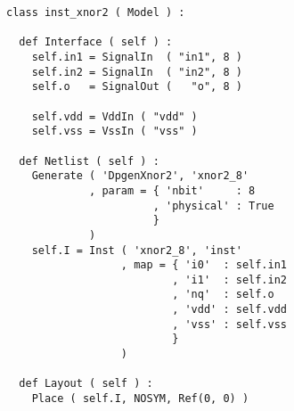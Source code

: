 \begin{itemize}
\begin{verbatim}
class inst_xnor2 ( Model ) :

  def Interface ( self ) :
    self.in1 = SignalIn  ( "in1", 8 )
    self.in2 = SignalIn  ( "in2", 8 )
    self.o   = SignalOut (   "o", 8 )

    self.vdd = VddIn ( "vdd" )
    self.vss = VssIn ( "vss" )
    
  def Netlist ( self ) :
    Generate ( 'DpgenXnor2', 'xnor2_8'
             , param = { 'nbit'     : 8
                       , 'physical' : True
                       }
             )
    self.I = Inst ( 'xnor2_8', 'inst'
                  , map = { 'i0'  : self.in1
                          , 'i1'  : self.in2
                          , 'nq'  : self.o
                          , 'vdd' : self.vdd
                          , 'vss' : self.vss
                          }
                  )
      
  def Layout ( self ) :
    Place ( self.I, NOSYM, Ref(0, 0) )
\end{verbatim}
\end{itemize}
